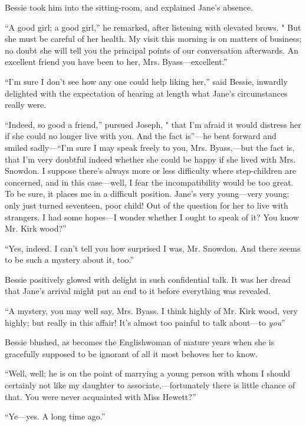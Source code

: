 Bessie took him into the sitting-room, and explained Jane's absence.

``A good girl; a good girl,'' he remarked, after listening with elevated
brows. " But she must be careful of her health. My visit this morning is
on matters of business; no doubt she will tell you the principal points
of our conversation afterwards. An excellent friend you have been to
her, Mrs. Byass---excellent.''

{\protect\hypertarget{224}{}{}}``I'm sure I don't see how any one could
help liking her,'' said Bessie, inwardly delighted with the expectation
of hearing at length what Jane's circumstances really were.

``Indeed, so good a friend,'' pursued Joseph, " that I'm afraid it would
distress her if she could no longer live with you. And the fact
is''---he bent forward and smiled sadly---``I'm sure I may speak freely
to you, Mrs. Byass,---but the fact is, that I'm very doubtful indeed
whether she could be happy if she lived with Mrs. Snowdon. I suppose
there's always more or less difficulty where step-children are
concerned, and in this case---well, I fear the incompatibility would be
too great. To be sure, it places me in a difficult position. Jane's very
young---very young; only just turned seventeen, poor child! Out of the
question for her to live with strangers. I had some hopes---I wonder
whether I ought to speak of it? You know Mr. Kirk wood?''

``Yes, indeed. I can't tell you how surprised I was, Mr. Snowdon. And
there seems to be such a mystery about it, too.''

Bessie positively glowed with delight in such confidential talk. It was
her dread that {\protect\hypertarget{225}{}{}}Jane's arrival might put
an end to it before everything was revealed.

``A mystery, you may well say, Mrs. Byass. I think highly of Mr. Kirk
wood, very highly; but really in this affair! It's almost too painful to
talk about---to \emph{you}''

Bessie blushed, as becomes the Englishwoman of mature years when she is
gracefully supposed to be ignorant of all it most behoves her to know.

``Well, well; he is on the point of marrying a young person with whom I
should certainly not like my daughter to associate,---fortunately there
is little chance of that. You were never acquainted with Miss Hewett?''

``Ye---yes. A long time ago.''


